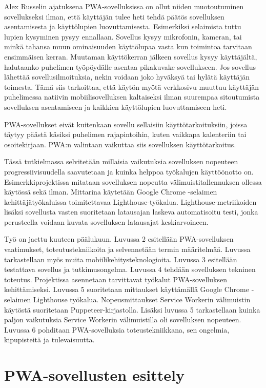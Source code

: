 \documentclass{tktltiki}
\begin{document}
Alex  Russelin ajatuksena \cite{Russell} PWA-sovelluksissa on ollut niiden muotoutuminen sovellukseksi ilman, että käyttäjän tulee heti tehdä päätös sovelluksen asentamisesta ja käyttölupien luovuttamisesta. Esimerkiksi selaimista tuttu lupien kysyminen pysyy ennallaan. Sovellus kysyy mikrofonin, kameran, tai minkä tahansa muun ominaisuuden käyttölupaa vasta kun toimintoa tarvitaan ensimmäisen kerran. Muutaman käyttökerran jälkeen sovellus kysyy käyttäjältä, halutaanko puhelimen työpöydälle asentaa pikakuvake sovellukseen. Jos sovellus lähettää sovellusilmoituksia, nekin voidaan joko hyväksyä tai hylätä käyttäjän toimesta. Tämä siis tarkoittaa, että käytön myötä verkkosivu muuttuu käyttäjän puhelimessa natiivin mobiilisovelluksen kaltaiseksi ilman suurempaa sitoutumista sovelluksen asentamiseen ja kaikkien käyttölupien luovuttamiseen heti. 

PWA-sovellukset eivät kuitenkaan sovellu sellaisiin käyttötarkoituksiin, joissa täytyy päästä käsiksi puhelimen rajapintoihin, kuten vaikkapa kalenteriin tai osoitekirjaan. PWA:n valintaan vaikuttaa siis sovelluksen käyttötarkoitus. 

Tässä tutkielmassa selvitetään millaisia vaikutuksia sovelluksen nopeuteen progressiivisuudella saavutetaan ja kuinka helppoa työkalujen käyttöönotto on. Esimerkkiprojektissa mitataan sovelluksen nopeutta välimuistitallennuksen ollessa käytössä sekä ilman. Mittarina käytetään Google Chrome -selaimen kehittäjätyökaluissa toimitettavaa Lighthouse-työkalua. Lighthouse-metriikoiden lisäksi sovellusta vasten suoritetaan latausajan laskeva automatisoitu testi, jonka perusteella voidaan kuvata sovelluksen latausajat keskiarvoineen. 

Työ on jaettu kuuteen päälukuun. Luvussa 2 esitellään PWA-sovelluksen vaatimukset, toteutustekniikoita ja selvennetään termin määritelmää. Luvussa tarkastellaan myös muita mobiilikehitysteknologioita. Luvussa 3 esitellään testattava sovellus ja tutkimusongelma. Luvussa 4 tehdään sovelluksen tekninen toteutus. Projektissa asennetaan tarvittavat työkalut PWA-sovelluksen kehittämiseksi. Luvussa 5 suoritetaan mittaukset käyttämällä Google Chrome -selaimen Lighthouse työkalua. Nopeusmittaukset Service Workerin välimuistin käytöstä suoritetaan Puppeteer-kirjastolla. Lisäksi luvussa 5 tarkastellaan kuinka paljon vaikutuksia Service Workerin välimuistilla oli sovelluksen nopeuteen. Luvussa 6 pohditaan PWA-sovelluksia toteustekniikkana, sen ongelmia, kipupisteitä ja tulevaisuutta.

\newpage
\section{PWA-sovellusten esittely}
\end{document}
